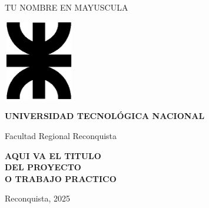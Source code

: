 \thispagestyle{empty}
\begin{center}
	
	

		
	{\large{\textsc{{TU NOMBRE EN MAYUSCULA}}}}
	
	\vspace{2cm}
	
	\includegraphics[width=31mm,height=35mm]{imagenes/LogoUTN_nvgsb.eps}
	
	\vspace{2cm}
	
	{\large{\textsc{\textbf{UNIVERSIDAD TECNOLÓGICA NACIONAL}}}}
	
	{\large{Facultad Regional Reconquista}}
	
	\vspace{2cm}
	
	{\Large{\textsc{\textbf{AQUI VA EL TITULO \\ DEL PROYECTO  \\ O TRABAJO PRACTICO\\}}}}
	
	\vfill
	
	{\large{Reconquista, 2025}}
\end{center}